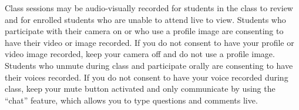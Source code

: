 Class sessions may be audio-visually recorded for students in the class to review
and for enrolled students who are unable to attend live to view. Students who
participate with their camera on or who use a profile image are consenting to
have their video or image recorded. If you do not consent to have your profile or
video image recorded, keep your camera off and do not use a profile image.
Students who unmute during class and participate orally are consenting to have
their voices recorded. If you do not consent to have your voice recorded during
class, keep your mute button activated and only communicate by using the ``chat''
feature, which allows you to type questions and comments live.
